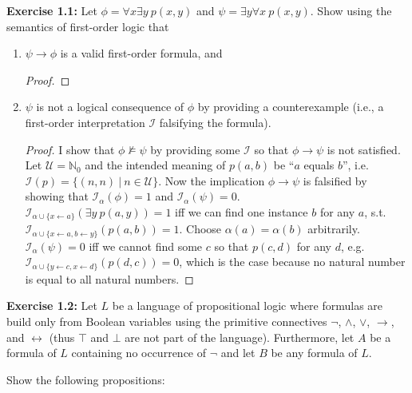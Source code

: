 \documentclass[11pt,a4paper]{article}
\theoremstyle{remark}
\newcommand{\N}{\mathbb{N}}
\newcommand{\entails}{\models}
\newcommand{\exercise}[1]{{\bfseries{Exercise #1:}}}
\begin{document}
\exercise{1.1} Let $\phi = \forall x \exists y \ p(x, y)$ and $\psi = \exists y \forall x \ p(x, y)$. Show using the semantics of first-order logic that
\begin{enumerate}[label=(\alph*)]
	\item $\psi \to \phi$ is a valid first-order formula, and
    
    \begin{proof}
    	
    \end{proof}
	\item $\psi$ is not a logical consequence of $\phi$ by providing a counterexample (i.e., a first-order interpretation $\mathcal{I}$ falsifying the formula).
    
    \begin{proof} I show that $\phi \not \entails \psi$ by providing some $\mathcal{I}$ so that $\phi \to \psi$ is not satisfied. Let $\mathcal{U} = \N_0$ and the intended meaning of $p(a, b)$ be \enquote{$a$ equals $b$}, i.e.~$\mathcal{I}(p) = \{(n, n) \ | \ n \in \mathcal{U}\}$. Now the implication $\phi \to \psi$ is falsified by showing that $\mathcal{I}_{\alpha}(\phi) = 1$ and $\mathcal{I}_{\alpha}(\psi) = 0$.\\ $\mathcal{I}_{\alpha \cup \{x \leftarrow a\}}(\exists y \ p(a, y)) = 1$ iff we can find one instance $b$ for any $a$, s.t.~$\mathcal{I}_{\alpha \cup \{x \leftarrow a, b \leftarrow y\}}(p(a, b)) = 1$. Choose $\alpha(a) = \alpha(b)$ arbitrarily.\\
$\mathcal{I}_{\alpha}(\psi) = 0$ iff we cannot find some $c$ so that $p(c,d)$ for any $d$, e.g.~$\mathcal{I}_{\alpha \cup \{y \leftarrow c, x \leftarrow d\}}(p(d, c)) = 0$, which is the case because no natural number is equal to all natural numbers.
    \end{proof}
\end{enumerate}

\exercise{1.2} Let $L$ be a language of propositional logic where formulas are build only from
Boolean variables using the primitive connectives $\neg$, $\wedge$, $\vee$, $\to$, and $\leftrightarrow$ (thus $\top$ and $\bot$ are not part of the language). Furthermore, let $A$ be a formula of $L$ containing no occurrence of $\neg$ and let $B$ be any formula of $L$.

Show the following propositions:
\end{document}
